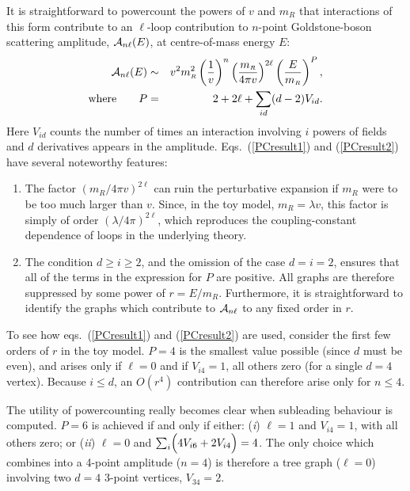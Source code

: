 \documentclass[12pt]{article}
\def\sst{\scriptscriptstyle}
\def\pref#1{(\ref{#1})}
\begin{document}
It is straightforward to powercount \cite{Burgess95} the powers
of $v$ and $m_{\sst R}$ that interactions of this form 
contribute to an $\ell$-loop contribution to
$n$-point Goldstone-boson scattering 
amplitude, ${\cal A}_{n\ell}(E)$, at centre-of-mass energy $E$:
%
\begin{eqnarray}
\label{PCresult1}
{\cal A}_{n\ell}(E) &\sim& v^2 m_{\sst R}^2  \left( {1 \over v} 
\right)^n \left( { m_{\sst R} \over 4 \pi v} \right)^{2\ell}
\left( {E \over m_{\sst R}} \right)^P, \\
\hbox{where} \qquad P &=& 2 + 2\ell + \sum_{id} (d-2) V_{id}.
\label{PCresult2}
\end{eqnarray}
%
Here $V_{id}$ counts the number of times an interaction involving
$i$ powers of fields and $d$ derivatives appears
in the amplitude. Eqs.~\pref{PCresult1} and \pref{PCresult2}
have several noteworthy features:
%
\begin{enumerate}
\item
The factor $(m_{\sst R}/4\pi v)^{2\ell}$ can ruin
the perturbative expansion if $m_{\sst R}$ were to
be too much larger than $v$. Since, in the toy model,
$m_{\sst R} = \lambda v$, this factor is simply
of order $(\lambda/4 \pi )^{2 \ell}$, which reproduces the
coupling-constant dependence of loops in the underlying theory.
%
\item
The condition $d \ge i \ge 2$, and the omission of
the case $d=i=2$, ensures that all of the
terms in the expression for $P$ are positive. All graphs
are therefore suppressed by some power of $r 
= E/m_{\sst R}$. Furthermore, it is straightforward
to identify the graphs which contribute to ${\cal A}_{n\ell}$
to any fixed order in $r$. 
\end{enumerate}

To see how eqs.~\pref{PCresult1} and \pref{PCresult2}
are used, consider the first few orders of
$r$ in the toy model. $P=4$ is the smallest value possible (since $d$
must be even), and arises only if $\ell = 0$ and if $V_{i4}=1$, 
all others zero (for a single $d=4$ vertex).
Because $i \le d$, an $O(r^4)$ contribution can therefore
arise only for $n  \le 4$. 

The utility of powercounting really becomes clear when 
subleading behaviour is computed. $P=6$ is
achieved if and only if either: ({\it i}) $\ell = 1$ and $V_{i4} = 1$,
with all others zero; or ({\it ii}) $\ell = 0$ and $\sum_{i}
\Bigl(4 V_{i6} + 2 V_{i4} \Bigr) = 4$. The only choice
which combines into a 4-point amplitude ($n=4$) is
therefore a tree graph ($\ell = 0$) involving two $d=4$
3-point vertices, $V_{34} = 2$. 
\end{document}
